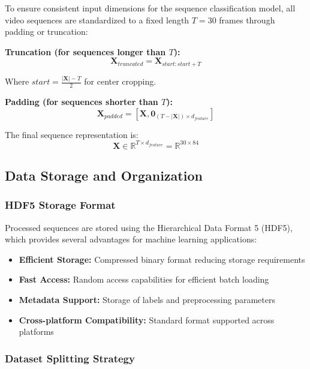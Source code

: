\documentclass[11pt, a4paper]{article}
\begin{document}
To ensure consistent input dimensions for the sequence classification model, all video sequences are standardized to a fixed length $T = 30$ frames through padding or truncation:

\textbf{Truncation (for sequences longer than $T$):}
\begin{equation}
\mathbf{X}_{truncated} = \mathbf{X}_{start:start+T}
\end{equation}

Where $start = \frac{|\mathbf{X}| - T}{2}$ for center cropping.

\textbf{Padding (for sequences shorter than $T$):}
\begin{equation}
\mathbf{X}_{padded} = [\mathbf{X}, \mathbf{0}_{(T-|\mathbf{X}|) \times d_{feature}}]
\end{equation}

The final sequence representation is:
\begin{equation}
\mathbf{X} \in \mathbb{R}^{T \times d_{feature}} = \mathbb{R}^{30 \times 84}
\end{equation}

\subsection{Data Storage and Organization}

\subsubsection{HDF5 Storage Format}

Processed sequences are stored using the Hierarchical Data Format 5 (HDF5), which provides several advantages for machine learning applications:

\begin{itemize}
    \item \textbf{Efficient Storage:} Compressed binary format reducing storage requirements
    \item \textbf{Fast Access:} Random access capabilities for efficient batch loading
    \item \textbf{Metadata Support:} Storage of labels and preprocessing parameters
    \item \textbf{Cross-platform Compatibility:} Standard format supported across platforms
\end{itemize}

\subsubsection{Dataset Splitting Strategy}
\end{document}
